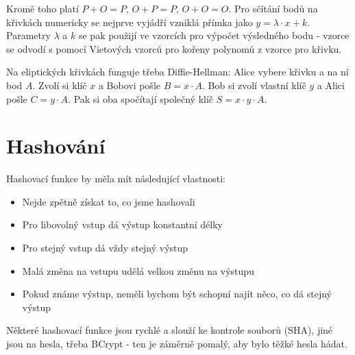 Kromě toho platí $P+O=P$, $O+P=P$, $O+O=O$. Pro sčítání bodů na křivkách numericky se nejprve vyjádří vzniklá přímka jako $y = \lambda\cdot x + k$. Parametry $\lambda$ a $k$ se pak použijí ve vzorcích pro výpočet výsledného bodu - vzorce se odvodí s pomocí Vietových vzorců pro kořeny polynomů z vzorce pro křivku.

Na eliptických křivkách funguje třeba Diffie-Hellman: Alice vybere křivku a na ní bod $A$. Zvolí si klíč $x$ a Bobovi pošle $B=x\cdot A$. Bob si zvolí vlastní klíč $y$ a Alici pošle $C = y\cdot A$. Pak si oba spočítají společný klíč $S = x\cdot y \cdot A$.

\section{Hashování}

Hashovací funkce by měla mít následující vlastnosti:
\begin{itemize}
\item Nejde zpětně získat to, co jsme hashovali
\item Pro libovolný vstup dá výstup konstantní délky
\item Pro stejný vstup dá vždy stejný výstup
\item Malá změna na vstupu udělá velkou změnu na výstupu
\item Pokud známe výstup, neměli bychom být schopní najít něco, co dá stejný výstup
\end{itemize}

Některé hashovací funkce jsou rychlé a slouží ke kontrole souborů (SHA), jiné jsou na hesla, třeba BCrypt - ten je záměrně pomalý, aby bylo těžké hesla hádat.
